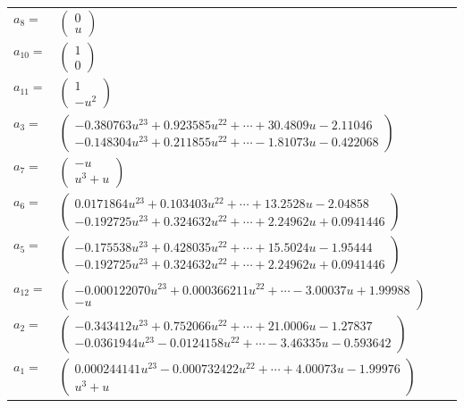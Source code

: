 \documentclass[1p]{elsarticle_modified}
\theoremstyle{definition}
\begin{document}
\begin{tabular}{m{7pt} m{180pt} m{7pt} m{180pt} }
\flushright $a_{8}=$&$\begin{pmatrix}0\\u\end{pmatrix}$ \\
\flushright $a_{10}=$&$\begin{pmatrix}1\\0\end{pmatrix}$ \\
\flushright $a_{11}=$&$\begin{pmatrix}1\\- u^2\end{pmatrix}$ \\
\flushright $a_{3}=$&$\begin{pmatrix}-0.380763 u^{23}+0.923585 u^{22}+\cdots+30.4809 u-2.11046\\-0.148304 u^{23}+0.211855 u^{22}+\cdots-1.81073 u-0.422068\end{pmatrix}$ \\
\flushright $a_{7}=$&$\begin{pmatrix}- u\\u^3+u\end{pmatrix}$ \\
\flushright $a_{6}=$&$\begin{pmatrix}0.0171864 u^{23}+0.103403 u^{22}+\cdots+13.2528 u-2.04858\\-0.192725 u^{23}+0.324632 u^{22}+\cdots+2.24962 u+0.0941446\end{pmatrix}$ \\
\flushright $a_{5}=$&$\begin{pmatrix}-0.175538 u^{23}+0.428035 u^{22}+\cdots+15.5024 u-1.95444\\-0.192725 u^{23}+0.324632 u^{22}+\cdots+2.24962 u+0.0941446\end{pmatrix}$ \\
\flushright $a_{12}=$&$\begin{pmatrix}-0.000122070 u^{23}+0.000366211 u^{22}+\cdots-3.00037 u+1.99988\\- u\end{pmatrix}$ \\
\flushright $a_{2}=$&$\begin{pmatrix}-0.343412 u^{23}+0.752066 u^{22}+\cdots+21.0006 u-1.27837\\-0.0361944 u^{23}-0.0124158 u^{22}+\cdots-3.46335 u-0.593642\end{pmatrix}$ \\
\flushright $a_{1}=$&$\begin{pmatrix}0.000244141 u^{23}-0.000732422 u^{22}+\cdots+4.00073 u-1.99976\\u^3+u\end{pmatrix}$ \\

\end{tabular}
\end{document}
